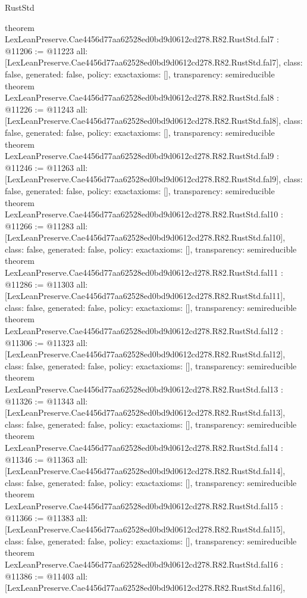 \begin{lexlean}{RustStd}
\begin{coremodule}
{}
theorem LexLeanPreserve.Cae4456d77aa62528ed0bd9d0612cd278.R82.RustStd.fal7 : @11206 := @11223 {
  all: [LexLeanPreserve.Cae4456d77aa62528ed0bd9d0612cd278.R82.RustStd.fal7],
  class: false,
  generated: false,
  policy: exact{axioms: []},
  transparency: semireducible
}
theorem LexLeanPreserve.Cae4456d77aa62528ed0bd9d0612cd278.R82.RustStd.fal8 : @11226 := @11243 {
  all: [LexLeanPreserve.Cae4456d77aa62528ed0bd9d0612cd278.R82.RustStd.fal8],
  class: false,
  generated: false,
  policy: exact{axioms: []},
  transparency: semireducible
}
theorem LexLeanPreserve.Cae4456d77aa62528ed0bd9d0612cd278.R82.RustStd.fal9 : @11246 := @11263 {
  all: [LexLeanPreserve.Cae4456d77aa62528ed0bd9d0612cd278.R82.RustStd.fal9],
  class: false,
  generated: false,
  policy: exact{axioms: []},
  transparency: semireducible
}
theorem LexLeanPreserve.Cae4456d77aa62528ed0bd9d0612cd278.R82.RustStd.fal10 : @11266 := @11283 {
  all: [LexLeanPreserve.Cae4456d77aa62528ed0bd9d0612cd278.R82.RustStd.fal10],
  class: false,
  generated: false,
  policy: exact{axioms: []},
  transparency: semireducible
}
theorem LexLeanPreserve.Cae4456d77aa62528ed0bd9d0612cd278.R82.RustStd.fal11 : @11286 := @11303 {
  all: [LexLeanPreserve.Cae4456d77aa62528ed0bd9d0612cd278.R82.RustStd.fal11],
  class: false,
  generated: false,
  policy: exact{axioms: []},
  transparency: semireducible
}
theorem LexLeanPreserve.Cae4456d77aa62528ed0bd9d0612cd278.R82.RustStd.fal12 : @11306 := @11323 {
  all: [LexLeanPreserve.Cae4456d77aa62528ed0bd9d0612cd278.R82.RustStd.fal12],
  class: false,
  generated: false,
  policy: exact{axioms: []},
  transparency: semireducible
}
theorem LexLeanPreserve.Cae4456d77aa62528ed0bd9d0612cd278.R82.RustStd.fal13 : @11326 := @11343 {
  all: [LexLeanPreserve.Cae4456d77aa62528ed0bd9d0612cd278.R82.RustStd.fal13],
  class: false,
  generated: false,
  policy: exact{axioms: []},
  transparency: semireducible
}
theorem LexLeanPreserve.Cae4456d77aa62528ed0bd9d0612cd278.R82.RustStd.fal14 : @11346 := @11363 {
  all: [LexLeanPreserve.Cae4456d77aa62528ed0bd9d0612cd278.R82.RustStd.fal14],
  class: false,
  generated: false,
  policy: exact{axioms: []},
  transparency: semireducible
}
theorem LexLeanPreserve.Cae4456d77aa62528ed0bd9d0612cd278.R82.RustStd.fal15 : @11366 := @11383 {
  all: [LexLeanPreserve.Cae4456d77aa62528ed0bd9d0612cd278.R82.RustStd.fal15],
  class: false,
  generated: false,
  policy: exact{axioms: []},
  transparency: semireducible
}
theorem LexLeanPreserve.Cae4456d77aa62528ed0bd9d0612cd278.R82.RustStd.fal16 : @11386 := @11403 {
  all: [LexLeanPreserve.Cae4456d77aa62528ed0bd9d0612cd278.R82.RustStd.fal16],
}
\end{coremodule}
\end{lexlean}
